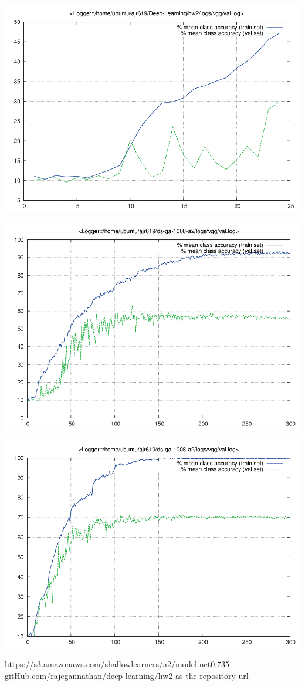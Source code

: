 \documentclass{article}
\begin{document}
\begin{centering}
\includegraphics[scale=0.3]{images/vgg/val.png}
\end{centering}

\begin{centering}
\includegraphics[scale=0.3]{images/vggInDS-ga/val.png}
\end{centering}

\begin{centering}
\includegraphics[scale=0.3]{images/logs_default/val.png}
\end{centering}

\begin{thebibliography}{9}
 \url{https://s3.amazonaws.com/shallowlearners/a2/model.net0.735}
\url{gitHub.com/rajegannathan/deep-learning/hw2 as the repository url}
\end{thebibliography}
\end{document}
